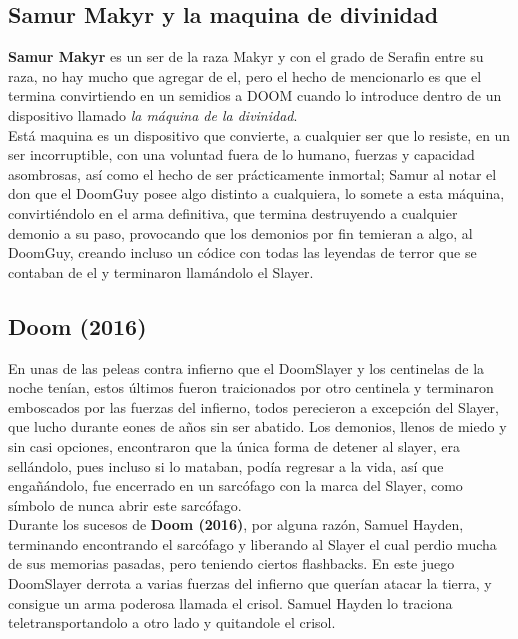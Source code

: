 \documentclass[spanish,12pt,letterpaper]{article}
\begin{document}
\subsection{Samur Makyr y la maquina de divinidad}

\noindent \textbf{Samur Makyr} es un ser de la raza Makyr y con el grado de Serafin entre su raza, no hay mucho que agregar de el, pero el hecho de mencionarlo es que el termina convirtiendo en un semidios a DOOM cuando lo introduce dentro de un dispositivo llamado \textit{la máquina de la divinidad}.\\[1mm]

\noindent Está maquina es un dispositivo que convierte, a cualquier ser que lo resiste, en un ser incorruptible, con una voluntad fuera de lo humano, fuerzas y capacidad asombrosas, así como el hecho de ser prácticamente inmortal; Samur al notar el don que el DoomGuy posee algo distinto a cualquiera, lo somete a esta máquina, convirtiéndolo en el arma definitiva, que termina destruyendo a cualquier demonio a su paso, provocando que los demonios por fin temieran a algo, al DoomGuy, creando incluso un códice con todas las leyendas de terror que se contaban de el y terminaron llamándolo el Slayer.

\subsection{Doom (2016)}

\noindent En unas de las peleas contra infierno que el DoomSlayer y los centinelas de la noche tenían, estos últimos fueron traicionados por otro centinela y terminaron emboscados por las fuerzas del infierno, todos perecieron a excepción del Slayer, que lucho durante eones de años sin ser abatido. Los demonios, llenos de miedo y sin casi opciones, encontraron que la única forma de detener al slayer, era sellándolo, pues incluso si lo mataban, podía regresar a la vida, así que engañándolo, fue encerrado en un sarcófago con la marca del Slayer, como símbolo de nunca abrir este sarcófago. \\[1mm]

\noindent Durante los sucesos de \textbf{Doom (2016)}, por alguna razón, Samuel Hayden, terminando encontrando el sarcófago y liberando al Slayer el cual perdio mucha de sus memorias pasadas, pero teniendo ciertos flashbacks. En este juego DoomSlayer derrota a varias fuerzas del infierno que querían atacar la tierra, y consigue un arma poderosa llamada el crisol. Samuel Hayden lo traciona teletransportandolo a otro lado y quitandole el crisol.
\end{document}
